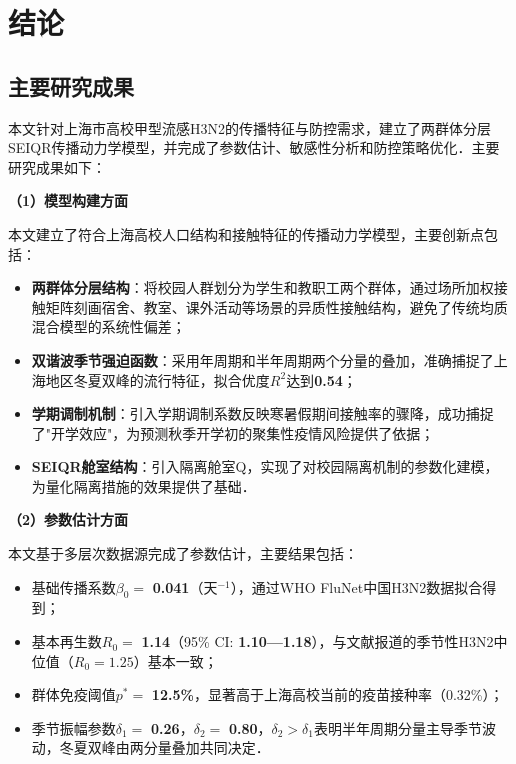\section{结论}
\label{section8}

\subsection{主要研究成果}

本文针对上海市高校甲型流感H3N2的传播特征与防控需求，建立了两群体分层SEIQR传播动力学模型，并完成了参数估计、敏感性分析和防控策略优化．主要研究成果如下：

\textbf{（1）模型构建方面}

本文建立了符合上海高校人口结构和接触特征的传播动力学模型，主要创新点包括：

\begin{itemize}
  \item \textbf{两群体分层结构}：将校园人群划分为学生和教职工两个群体，通过场所加权接触矩阵刻画宿舍、教室、课外活动等场景的异质性接触结构，避免了传统均质混合模型的系统性偏差；
  
  \item \textbf{双谐波季节强迫函数}：采用年周期和半年周期两个分量的叠加，准确捕捉了上海地区冬夏双峰的流行特征，拟合优度$R^2$达到\textbf{0.54}；
  
  \item \textbf{学期调制机制}：引入学期调制系数反映寒暑假期间接触率的骤降，成功捕捉了"开学效应"，为预测秋季开学初的聚集性疫情风险提供了依据；
  
  \item \textbf{SEIQR舱室结构}：引入隔离舱室Q，实现了对校园隔离机制的参数化建模，为量化隔离措施的效果提供了基础．
\end{itemize}

\textbf{（2）参数估计方面}

本文基于多层次数据源完成了参数估计，主要结果包括：

\begin{itemize}
  \item 基础传播系数$\beta_0 =$ \textbf{0.041}（天$^{-1}$），通过WHO FluNet中国H3N2数据拟合得到；
  \item 基本再生数$R_0 =$ \textbf{1.14}（95\% CI: \textbf{1.10—1.18}），与文献报道的季节性H3N2中位值（$R_0=1.25$）基本一致；
  \item 群体免疫阈值$p^* =$ \textbf{12.5\%}，显著高于上海高校当前的疫苗接种率（0.32\%）；
  \item 季节振幅参数$\delta_1 =$ \textbf{0.26}，$\delta_2 =$ \textbf{0.80}，$\delta_2 > \delta_1$表明半年周期分量主导季节波动，冬夏双峰由两分量叠加共同决定．
\end{itemize}

